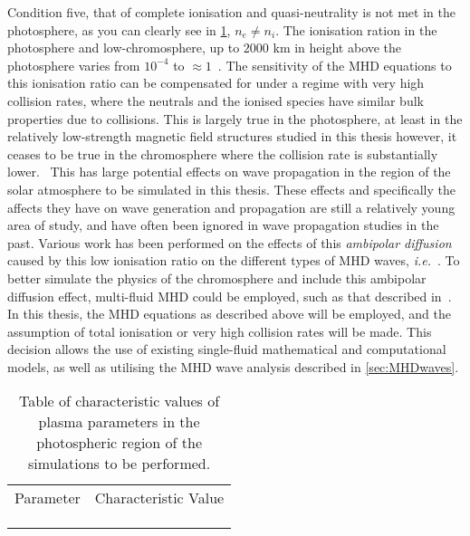 Condition five, that of complete ionisation and quasi-neutrality is not met in the photosphere, as you can clearly see in \cref{table:MHDvalues}, $n_e \neq n_i$.
The ionisation ration in the photosphere and low-chromosphere, up to $2000$ km in height above the photosphere varies from $10^{-4}$ to $\approx 1$~\citep{priest2014}.
The sensitivity of the MHD equations to this ionisation ratio can be compensated for under a regime with very high collision rates, where the neutrals and the ionised species have similar bulk properties due to collisions.
This is largely true in the photosphere, at least in the relatively low-strength magnetic field structures studied in this thesis however, it ceases to be true in the chromosphere where the collision rate is substantially lower.~\citep{khomenko2014}
This has large potential effects on wave propagation in the region of the solar atmosphere to be simulated in this thesis.
These effects and specifically the affects they have on wave generation and propagation are still a relatively young area of study, and have often been ignored in wave propagation studies in the past.
Various work has been performed on the effects of this \emph{ambipolar diffusion} caused by this low ionisation ratio on the different types of MHD waves, \emph{i.e.}~\cite{kumar2003,soler2010,zaqarashvili2011}.
To better simulate the physics of the chromosphere and include this ambipolar diffusion effect, multi-fluid MHD could be employed, such as that described in~\cite{khomenko2014}.
In this thesis, the MHD equations as described above will be employed, and the assumption of total ionisation or very high collision rates will be made.
This decision allows the use of existing single-fluid mathematical and computational models, as well as utilising the MHD wave analysis described in \cref{sec:MHDwaves}.

\begin{table}[]
\centering
\begin{tabular}{ll}
Parameter & Characteristic Value \\
          &                      \\
          &                      \\
          &                     
\end{tabular}
\caption{Table of characteristic values of plasma parameters in the photospheric region of the simulations to be performed.}
\label{table:MHDvalues}
\end{table}


